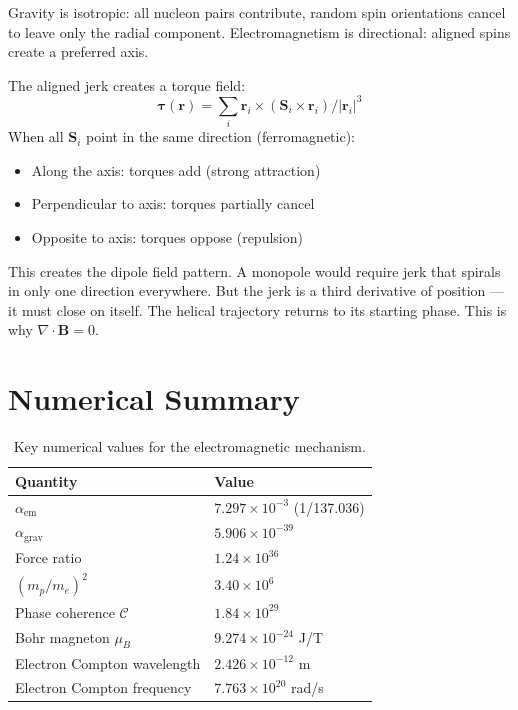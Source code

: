 \documentclass[11pt,letterpaper]{article}
\begin{document}
Gravity is isotropic: all nucleon pairs contribute, random spin orientations
cancel to leave only the radial component. Electromagnetism is directional:
aligned spins create a preferred axis.

The aligned jerk creates a torque field:
\begin{equation}
  \boldsymbol{\tau}(\mathbf{r}) = \sum_i \mathbf{r}_i \times (\mathbf{S}_i \times \mathbf{r}_i) / |\mathbf{r}_i|^3
  \label{eq:dipole_field}
\end{equation}
When all $\mathbf{S}_i$ point in the same direction (ferromagnetic):

\begin{itemize}
  \item Along the axis: torques add (strong attraction)
  \item Perpendicular to axis: torques partially cancel
  \item Opposite to axis: torques oppose (repulsion)
\end{itemize}

This creates the dipole field pattern. A monopole would require jerk that
spirals in only one direction everywhere. But the jerk is a third derivative
of position --- it must close on itself. The helical trajectory returns to its
starting phase. This is why $\nabla \cdot \mathbf{B} = 0$.

\section{Numerical Summary}

\begin{table}[H]
  \centering
  \caption{Key numerical values for the electromagnetic mechanism.}
  \label{tab:numbers}
  \begin{tabular}{ll}
    \toprule
    Quantity & Value \\
    \midrule
    $\alpha_{\mathrm{em}}$ & $7.297 \times 10^{-3}$ (1/137.036) \\
    $\alpha_{\mathrm{grav}}$ & $5.906 \times 10^{-39}$ \\
    Force ratio & $1.24 \times 10^{36}$ \\
    $(m_p/m_e)^2$ & $3.40 \times 10^6$ \\
    Phase coherence $\mathcal{C}$ & $1.84 \times 10^{29}$ \\
    Bohr magneton $\mu_B$ & $9.274 \times 10^{-24}$ J/T \\
    Electron Compton wavelength & $2.426 \times 10^{-12}$ m \\
    Electron Compton frequency & $7.763 \times 10^{20}$ rad/s \\
    \bottomrule
  \end{tabular}
\end{table}
\end{document}

